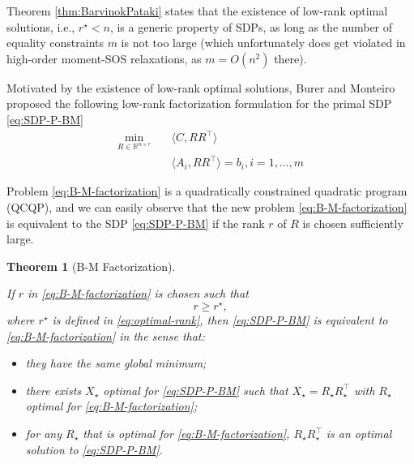 \documentclass[
]{book}
\newtheorem{theorem}{Theorem}[chapter]
\theoremstyle{definition}
\theoremstyle{definition}
\theoremstyle{definition}
\theoremstyle{definition}
\theoremstyle{remark}
\begin{document}
Theorem \ref{thm:BarvinokPataki} states that the existence of low-rank optimal solutions, i.e., \(r^\star < n\), is a generic property of SDPs, as long as the number of equality constraints \(m\) is not too large (which unfortunately does get violated in high-order moment-SOS relaxations, as \(m = O(n^2)\) there).

Motivated by the existence of low-rank optimal solutions, Burer and Monteiro proposed the following low-rank factorization formulation for the primal SDP \eqref{eq:SDP-P-BM}
\begin{equation}
\begin{split}
\min_{R \in \mathbb{R}^{n \times r}} & \quad \langle C, RR^\top \rangle \\
& \quad \langle A_i, RR^\top \rangle = b_i, i=1,\dots,m
\end{split}
\label{eq:B-M-factorization}
\end{equation}

Problem \eqref{eq:B-M-factorization} is a quadratically constrained quadratic program (QCQP), and
we can easily observe that the new problem \eqref{eq:B-M-factorization} is equivalent to the SDP \eqref{eq:SDP-P-BM} if the rank \(r\) of \(R\) is chosen sufficiently large.

\begin{theorem}[B-M Factorization]
\protect\hypertarget{thm:BMFactorization}{}\label{thm:BMFactorization}

If \(r\) in \eqref{eq:B-M-factorization} is chosen such that
\[
r \geq r^\star,
\]
where \(r^\star\) is defined in \eqref{eq:optimal-rank}, then \eqref{eq:SDP-P-BM} is equivalent to \eqref{eq:B-M-factorization} in the sense that:

\begin{itemize}
\item
  they have the same global minimum;
\item
  there exists \(X_\star\) optimal for \eqref{eq:SDP-P-BM} such that \(X_\star = R_\star R_\star^\top\) with \(R_\star\) optimal for \eqref{eq:B-M-factorization};
\item
  for any \(R_\star\) that is optimal for \eqref{eq:B-M-factorization}, \(R_\star R_\star^\top\) is an optimal solution to \eqref{eq:SDP-P-BM}.
\end{itemize}

\end{theorem}
\end{document}
